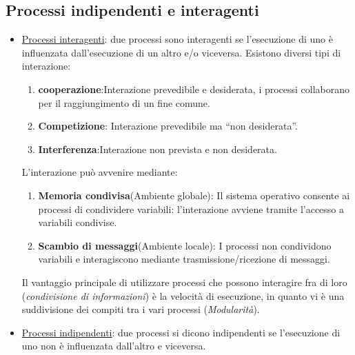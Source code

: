 \documentclass{article}
\begin{document}
\subsection{Processi indipendenti e interagenti}

\begin{itemize}
    \item \underline{Processi interagenti}: due processi 
    sono interagenti se l'esecuzione di uno è influenzata
    dall'esecuzione di un altro e/o viceversa. Esistono diversi
    tipi di interazione: \begin{enumerate}
        \item \textbf{cooperazione}:Interazione prevedibile e
        desiderata, i processi collaborano per il 
        raggiungimento di un fine comune.
        \item \textbf{Competizione}: Interazione prevedibile
        ma “non desiderata”.
        \item \textbf{Interferenza}:Interazione non prevista
         e non desiderata. 
    \end{enumerate}
    L'interazione può avvenire mediante:
    \begin{enumerate}
        \item \textbf{Memoria condivisa}(Ambiente globale):
        Il sistema operativo consente ai processi di condividere variabili: 
        l'interazione avviene tramite l'accesso a variabili
        condivise.
        \item \textbf{Scambio di messaggi}(Ambiente locale): 
        I processi non condividono variabili e interagiscono mediante
        trasmissione/ricezione di messaggi.
    \end{enumerate}
    Il vantaggio principale di utilizzare processi che possono
    interagire fra di loro (\textit{condivisione di informazioni})
    è la velocità di esecuzione, in quanto vi è una
    suddivisione dei compiti tra i vari processi (\textit{Modularità}).
    
    \item \underline{Processi indipendenti}: due processi si dicono 
    indipendenti se l'esecuzione di uno non è influenzata dall'altro e viceversa.
\end{itemize}
\end{document}

